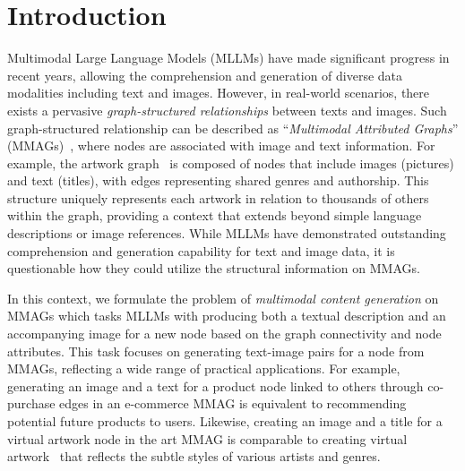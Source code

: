 \section{Introduction}
\label{sec:intro}

Multimodal Large Language Models (MLLMs) \cite{dong2024dreamllmsynergisticmultimodalcomprehension,liu2024visual,sun2024generative,li2023blip} have made significant progress in recent years, allowing the comprehension and generation of diverse data modalities including text and images. 
However, in real-world scenarios, there exists a pervasive \textit{graph-structured relationships} between texts and images.
Such graph-structured relationship can be described as ``\textit{Multimodal Attributed Graphs}'' (MMAGs)~\cite{peng2024learningmultimodalgraphssurvey,jin2024instructg2isynthesizingimagesmultimodal,zhu2024multimodalgraphbenchmark}, where nodes are associated with image and text information.
For example, the artwork graph~\cite{mao2019visual} is composed of nodes that include images (pictures) and text (titles), with edges representing shared genres and authorship. This structure uniquely represents each artwork in relation to thousands of others within the graph, providing a context that extends beyond simple language descriptions or image references.
While MLLMs have demonstrated outstanding comprehension and generation capability for text and image data, it is questionable how they could utilize the structural information on MMAGs.

In this context, we formulate the problem of \textit{multimodal content generation} on MMAGs which tasks MLLMs with producing both a textual description and an accompanying image for a new node based on the graph connectivity and node attributes.
This task focuses on generating text-image pairs for a node from MMAGs, reflecting a wide range of practical applications. 
For example, generating an image and a text for a product node linked to others through co-purchase edges in an e-commerce MMAG is equivalent to recommending~\cite{deldjoo2024reviewmodernrecommendersystems,liu2024multibehaviorgenerativerecommendation} potential future products to users.
Likewise, creating an image and a title for a virtual artwork node in the art MMAG is comparable to creating virtual artwork~\cite{huang2022drawartdreamdiverse,epstein2023art} that reflects the subtle styles of various artists and genres.

